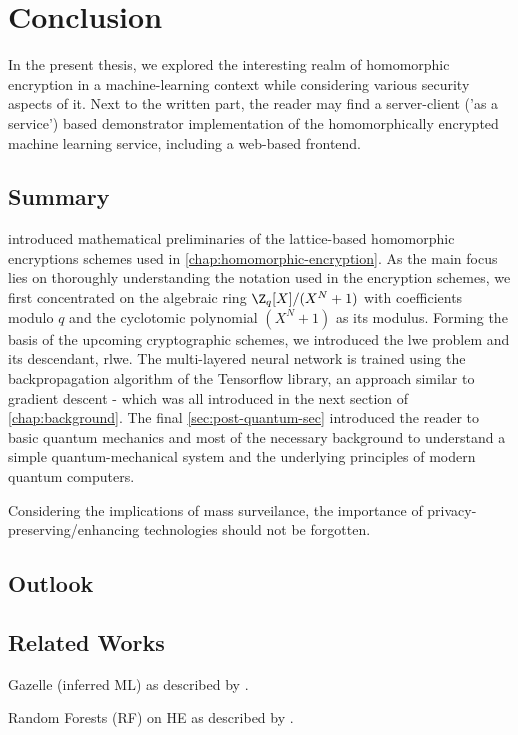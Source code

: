 \chapter{Conclusion}
\label{chap:conclusion}

In the present thesis, we explored the interesting realm of homomorphic encryption in a machine-learning context while considering various security aspects of it.
Next to the written part, the reader may find a server-client ('as a service') based demonstrator implementation of the homomorphically encrypted machine learning service, including a web-based frontend.

\section{Summary}
 introduced mathematical preliminaries of the lattice-based homomorphic encryptions schemes used in \cref{chap:homomorphic-encryption}.
As the main focus lies on thoroughly understanding the notation used in the encryption schemes, we first concentrated on the algebraic ring $\Z_q[X]/(X^N+1)$ with coefficients modulo $q$ and the cyclotomic polynomial $(X^N+1)$ as its modulus.
Forming the basis of the upcoming cryptographic schemes, we introduced the \gls{lwe} problem and its descendant, \gls{rlwe}.
The multi-layered neural network is trained using the backpropagation algorithm of the Tensorflow library, an approach similar to gradient descent - which was all introduced in the next section of \cref{chap:background}.
The final \cref{sec:post-quantum-sec} introduced the reader to basic quantum mechanics and most of the necessary background to understand a simple quantum-mechanical system and the underlying principles of modern quantum computers.



Considering the implications of mass surveilance, the importance of privacy-preserving/enhancing technologies should not be forgotten.


\section{Outlook}

\section{Related Works}

Gazelle (inferred ML) as described by \cite{2018-gazelle}.

Random Forests (RF) on HE as described by \cite{2020-cryptotree}.
